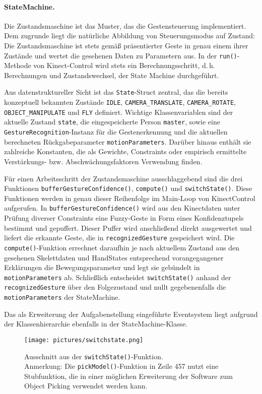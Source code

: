 	\paragraph{StateMachine.}
	Die Zustandsmaschine ist das Muster, das die Gestensteuerung implementiert. Dem zugrunde liegt die natürliche Abbildung von Steuerungsmodus auf Zustand: Die Zustandsmaschine ist stets gemäß präsentierter Geste in genau einem ihrer Zustände und wertet die gesehenen Daten zu Parametern aus. In der \texttt{run()}-Methode von Kinect-Control wird stets ein Berechnungsschritt, d.\,h. Berechnungen und Zustandswechsel, der State Machine durchgeführt.\par 
	Aus datenstruktureller Sicht ist das \texttt{State}-Struct zentral, das die bereits konzeptuell bekannten Zustände \texttt{IDLE}, \texttt{CAMERA\_TRANSLATE}, \texttt{CAMERA\_ROTATE}, \texttt{OBJECT\_MANIPULATE} und \texttt{FLY} definiert. Wichtige Klassenvariablen sind der aktuelle Zustand \glqq{}\texttt{state}\grqq{}, die eingespeicherte Person \glqq{}\texttt{master}\grqq{}, sowie eine \texttt{GestureRecognition}-Instanz für die Gestenerkennung und die aktuellen berechneten Rückgabeparameter \glqq{}\texttt{motionParameters}\grqq{}. Darüber hinaus enthält sie zahlreiche Konstanten, die als Gewichte, Constraints oder empirisch ermittelte Verstärkungs- bzw. Abschwächungsfaktoren Verwendung finden.\par 
	Für einen Arbeitsschritt der Zustandsmaschine ausschlaggebend sind die drei Funktionen \texttt{bufferGestureConfidence()}, \texttt{compute()} und \texttt{switchState()}. Diese Funktionen werden in genau dieser Reihenfolge im Main-Loop von KinectControl aufgerufen. In \texttt{bufferGestureConfidence()} wird aus den Kinectdaten unter Prüfung diverser Constraints eine Fuzzy-Geste in Form eines Konfidenztupels bestimmt und gepuffert. Dieser Puffer wird anschließend direkt ausgewertet und liefert die erkannte Geste, die in \texttt{recognizedGesture} gespeichert wird. Die \texttt{compute()}-Funktion errechnet daraufhin je nach aktuellem Zustand aus den gesehenen Skelettdaten und HandStates entsprechend vorangegangener Erklärungen die Bewegungsparameter und legt sie gebündelt in \texttt{motionParameters} ab. Schließlich entscheidet \texttt{switchState()} anhand der \texttt{recognizedGesture} über den Folgezustand und nullt gegebenenfalls die \texttt{motionParameters} der StateMachine.\par 
	Das als Erweiterung der Aufgabenstellung eingeführte Eventsystem liegt aufgrund der Klassenhierarchie ebenfalls in der StateMachine-Klasse.
	\begin{figure}[!h]
	\centering
	\texttt{[image: pictures/switchstate.png]}
	\caption{Ausschnitt aus der \texttt{switchState()}-Funktion.\\Anmerkung: Die \texttt{pickModel()}-Funktion in Zeile 457 nutzt eine Stubfunktion, die in einer möglichen Erweiterung der Software zum Object Picking verwendet werden kann.}\label{fig:switchstate}
	\end{figure}